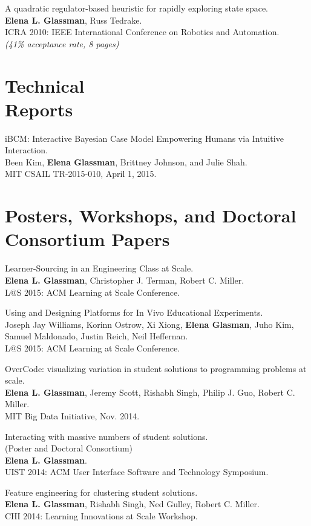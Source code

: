 \documentclass[margin]{res}
\begin{document}
\begin{resume}
A quadratic regulator-based heuristic for rapidly exploring state space.\\
{\bf Elena L. Glassman}, Russ Tedrake.\\
ICRA 2010: IEEE International Conference on Robotics and Automation.\\ 
{\it (41\% acceptance rate, 8 pages)}

\section{Technical\\ Reports}

iBCM: Interactive Bayesian Case Model Empowering Humans via Intuitive Interaction.\\
Been Kim, {\bf Elena Glassman}, Brittney Johnson, and Julie Shah.\\
MIT CSAIL TR-2015-010, April 1, 2015.

\section{Posters, Workshops, and Doctoral Consortium Papers}

Learner-Sourcing in an Engineering Class at Scale.\\
{\bf Elena L. Glassman}, Christopher J. Terman, Robert C. Miller.\\
L$@$S 2015: ACM Learning at Scale Conference.

Using and Designing Platforms for In Vivo Educational Experiments.\\
Joseph Jay Williams, Korinn Ostrow, Xi Xiong, {\bf Elena Glasman}, Juho Kim, Samuel Maldonado, Justin
Reich, Neil Heffernan.\\
L$@$S 2015: ACM Learning at Scale Conference.

OverCode: visualizing variation in student solutions to programming problems at scale.\\
{\bf Elena L. Glassman}, Jeremy Scott, Rishabh Singh, Philip J. Guo, Robert C. Miller. \\ 
MIT Big Data Initiative, Nov. 2014.

Interacting with massive numbers of student solutions.\\ (Poster and Doctoral Consortium)\\
{\bf Elena L. Glassman}.\\ 
UIST 2014: ACM User Interface Software and Technology Symposium.

Feature engineering for clustering student solutions.\\
{\bf Elena L. Glassman}, Rishabh Singh, Ned Gulley, Robert C. Miller.\\
CHI 2014: Learning Innovations at Scale Workshop.


\end{resume}
\end{document}

